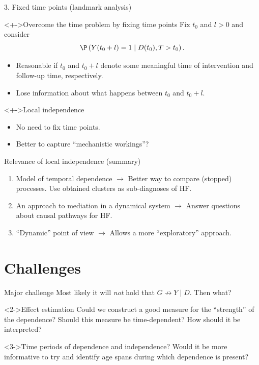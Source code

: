 \documentclass{beamer}\usepackage{listings}
\begin{document}
\begin{frame}[label={sec:org3a576f1}]{3. Fixed time points (landmark analysis)}
\begin{block}<+->{Overcome the time problem by fixing time points}
Fix \(t_0\) and \(l >0\) and consider 
\begin{equation*}
  \P\left(Y(t_0 + l) = 1 \mid D(t_0), T > t_0 \right).
\end{equation*}

\begin{itemize}
\item Reasonable if \(t_0\) and \(t_0+l\) denote some meaningful time of intervention and follow-up time,
respectively.
\item Lose information about what happens between \(t_0\) and \(t_0 + l\).
\end{itemize}
\end{block}

\begin{block}<+->{Local independence}
\begin{itemize}
\item No need to fix time points.
\item Better to capture ``mechanistic workings''?
\end{itemize}
\end{block}
\end{frame}

\begin{frame}[label={sec:org415044e}]{Relevance of local independence (summary)}
\begin{enumerate}
\item Model of temporal dependence \(\rightarrow\) Better way to compare (stopped) processes. Use obtained
clusters as sub-diagnoses of HF.
\item An approach to mediation in a dynamical system \(\rightarrow\) Answer questions about causal pathways
for HF.
\item ``Dynamic'' point of view \(\rightarrow\) Allows a more ``exploratory'' approach.
\end{enumerate}
\end{frame}

\section{Challenges}
\label{sec:orga0bebe0}
\begin{frame}[label={sec:org4dd63a2}]{Major challenge}
\center Most likely it will \emph{not} hold that \(G \not \rightarrow Y \mid D\). Then what?

\vfill 

\begin{block}<2->{Effect estimation}
Could we construct a good measure for the ``strength'' of the dependence? Should this measure be
time-dependent? How should it be interpreted?
\end{block}

\begin{block}<3->{Time periods of dependence and independence?}
Would it be more informative to try and identify age spans during which dependence is present?
\end{block}
\end{frame}
\end{document}
